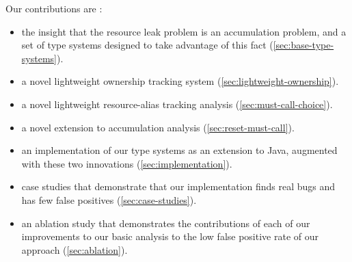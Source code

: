 Our contributions are :
\begin{itemize}
\item the insight that the resource leak problem is an accumulation problem,
  and a set of type systems designed to take advantage of this fact (\cref{sec:base-type-systems}).
\item a novel lightweight ownership tracking system (\cref{sec:lightweight-ownership}).
\item a novel lightweight resource-alias tracking analysis (\cref{sec:must-call-choice}).
\item a novel extension to accumulation analysis (\cref{sec:reset-must-call}).
\item an implementation of our type systems as an extension to Java,
  augmented with these two innovations (\cref{sec:implementation}).
\item case studies that demonstrate that our implementation finds real
  bugs and has few false positives (\cref{sec:case-studies}).
\item an ablation study that demonstrates the contributions of
  each of our improvements to our basic analysis to the low false
  positive rate of our approach (\cref{sec:ablation}).
\end{itemize}
  
